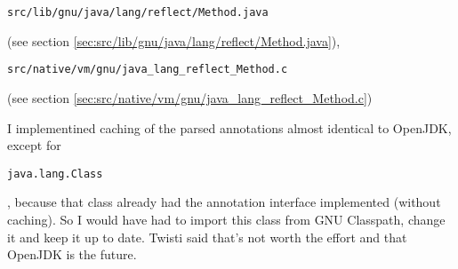 \documentclass[a4paper, 10pt, titlepage]{scrartcl} %
\begin{document}
\begin{scriptsize}\verb|src|\hspace{0.0pt}\verb|/|\hspace{0.0pt}\verb|lib|\hspace{0.0pt}\verb|/|\hspace{0.0pt}\verb|gnu|\hspace{0.0pt}\verb|/|\hspace{0.0pt}\verb|java|\hspace{0.0pt}\verb|/|\hspace{0.0pt}\verb|lang|\hspace{0.0pt}\verb|/|\hspace{0.0pt}\verb|reflect|\hspace{0.0pt}\verb|/|\hspace{0.0pt}\verb|Method|\hspace{0.0pt}\verb|.|\hspace{0.0pt}\verb|java|\end{scriptsize} (see section \ref{sec:src/lib/gnu/java/lang/reflect/Method.java}),
\begin{scriptsize}\verb|src|\hspace{0.0pt}\verb|/|\hspace{0.0pt}\verb|native|\hspace{0.0pt}\verb|/|\hspace{0.0pt}\verb|vm|\hspace{0.0pt}\verb|/|\hspace{0.0pt}\verb|gnu|\hspace{0.0pt}\verb|/|\hspace{0.0pt}\verb|java_lang_reflect_Method|\hspace{0.0pt}\verb|.|\hspace{0.0pt}\verb|c|\end{scriptsize} (see section \ref{sec:src/native/vm/gnu/java_lang_reflect_Method.c})

I implementined caching of the parsed annotations almost identical to OpenJDK,
except for \begin{scriptsize}\verb|java|\hspace{0.0pt}\verb|.|\hspace{0.0pt}\verb|lang|\hspace{0.0pt}\verb|.|\hspace{0.0pt}\verb|Class|\end{scriptsize}, because that class already had the annotation
interface implemented (without caching). So I would have had to import this class
from GNU Classpath, change it and keep it up to date. Twisti said that's not
worth the effort and that OpenJDK is the future.
\end{document}

